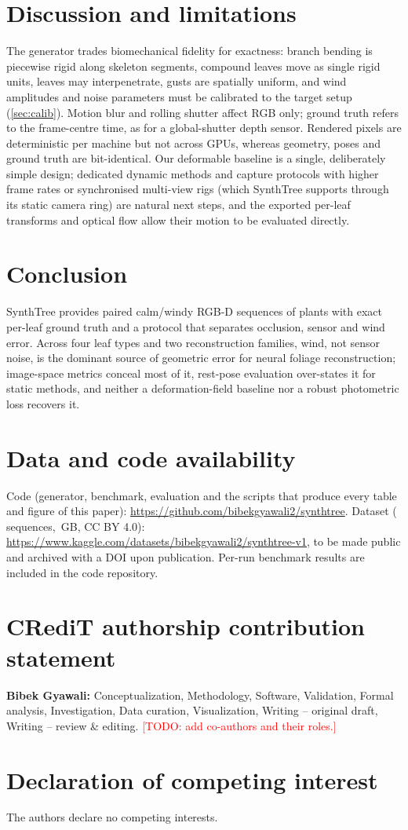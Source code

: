 \documentclass[preprint,11pt,authoryear]{elsarticle}
\newcommand{\todo}[1]{\textcolor{red}{[TODO: #1]}}
\begin{document}
\section{Discussion and limitations}
The generator trades biomechanical fidelity for exactness: branch bending is piecewise rigid along skeleton segments, compound leaves move as single rigid units, leaves may interpenetrate, gusts are spatially uniform, and wind amplitudes and noise parameters must be calibrated to the target setup (\cref{sec:calib}). Motion blur and rolling shutter affect RGB only; ground truth refers to the frame-centre time, as for a global-shutter depth sensor. Rendered pixels are deterministic per machine but not across GPUs, whereas geometry, poses and ground truth are bit-identical. Our deformable baseline is a single, deliberately simple design; dedicated dynamic methods \citep{wu20244dgs,luiten2024dynamic} and capture protocols with higher frame rates or synchronised multi-view rigs (which SynthTree supports through its static camera ring) are natural next steps, and the exported per-leaf transforms and optical flow allow their motion to be evaluated directly.

\section{Conclusion}
SynthTree provides paired calm/windy RGB-D sequences of plants with exact per-leaf ground truth and a protocol that separates occlusion, sensor and wind error. Across four leaf types and two reconstruction families, wind, not sensor noise, is the dominant source of geometric error for neural foliage reconstruction; image-space metrics conceal most of it, rest-pose evaluation over-states it for static methods, and neither a deformation-field baseline nor a robust photometric loss recovers it.

\section*{Data and code availability}\label{sec:availability}
Code (generator, benchmark, evaluation and the scripts that produce every table and figure of this paper): \url{https://github.com/bibekgyawali2/synthtree}. Dataset (\NSeq{} sequences, \DatasetGB\,GB, CC BY 4.0): \url{https://www.kaggle.com/datasets/bibekgyawali2/synthtree-v1}, to be made public and archived with a DOI upon publication. Per-run benchmark results are included in the code repository.

\section*{CRediT authorship contribution statement}
\textbf{Bibek Gyawali:} Conceptualization, Methodology, Software, Validation, Formal analysis, Investigation, Data curation, Visualization, Writing -- original draft, Writing -- review \& editing. \todo{add co-authors and their roles.}

\section*{Declaration of competing interest}
The authors declare no competing interests.



\end{document}
